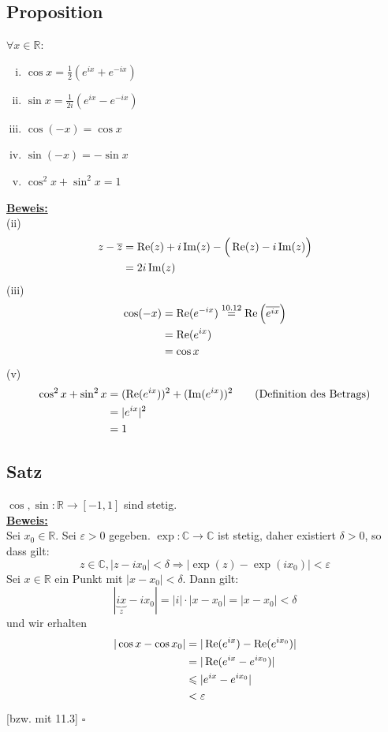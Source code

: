 \subsection{Proposition} %
\label{sub:proposition}
$\forall x\in \mathds{R}: $
\begin{enumerate}[(i)]
	\item $\cos x = \frac{1}{2} ( e^{ix} + e^{-ix}) $
	\item $\sin x = \frac{1}{2i} ( e^{ix} - e^{-ix}) $
	\item $\cos(-x) =  \cos x$
	\item $\sin (-x) = - \sin x $
	\item $\cos^2 x + \sin^2 x = 1$
\end{enumerate}
\underline{\textbf{Beweis:}} \\
(ii) \begin{align*}
	z-\overline{z} &= \operatorname{Re}(z) + i \operatorname{Im}(z) - \Big( \operatorname{Re}(z) - i \operatorname{Im}(z) \Big) \\
	&= 2i \operatorname{Im}(z)
\end{align*}
(iii)
\begin{align*}
	\cos(-x) &= \operatorname{Re}(e^{-ix}) \overset{\text{10.12}}{=} \operatorname{Re} \left(\overline{e^{ix}}\right) \\
	&= \operatorname{Re}(e^{ix}) \\
	&= \cos x
\end{align*}
(v)
\begin{align*}
	\cos^2 x + \sin^2 x &= (\operatorname{Re}(e^{ix}))^2 + (\operatorname{Im}(e^{ix}))^2 \tag{Definition des Betrags}\\
	&= | e^{ix} | ^2  \\&= 1
\end{align*}

\subsection{Satz} %
\label{sub:satz}
$\cos , \sin : \mathds{R} \to [-1,1] $ sind stetig.
\vspace{\baselineskip} \\
\underline{\textbf{Beweis:}} \\
Sei $x_0 \in \mathds{R}$. Sei $\varepsilon >0$ gegeben. $\exp  : \mathds{C} \to \mathds{C}$ ist stetig, daher existiert $\delta >0$, so dass gilt:
\[
	z \in \mathds{C}, |z- ix_0 | < \delta \Longrightarrow  | \exp (z) - \exp (ix_0) | < \varepsilon 
\]
Sei $x \in \mathds{R}$ ein Punkt mit $|x-x_0| < \delta$. Dann gilt:
\[
	|\underbrace{ix}_{z} -ix_0 | = |i| \cdot |x-x_0|  =|x-x_0| < \delta 
\]
und wir erhalten
\begin{align*}
		| \cos x - \cos x_0 | &= |\operatorname{Re}(e^{ix}) - \operatorname{Re}(e^{ix_0}) | \\
		&= | \operatorname{Re}(e^{ix} - e^{ix_0})| \\
		&\leqslant | e^{ix} - e^{ix_0}| \\
		&< \varepsilon
\end{align*}
[bzw. mit 11.3] \hfill \( \square \)


